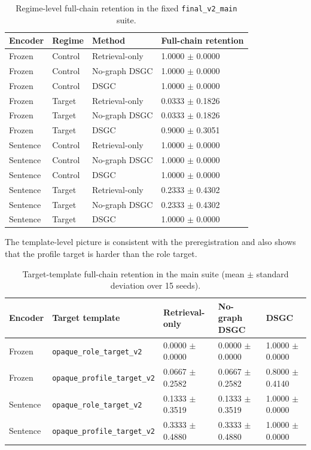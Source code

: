\documentclass[10pt]{article}
\begin{document}
\begin{table}[H]
\centering
\small
\begin{tabular}{llll}
\toprule
Encoder & Regime & Method & Full-chain retention \\
\midrule
Frozen & Control & Retrieval-only & 1.0000 $\pm$ 0.0000 \\
Frozen & Control & No-graph DSGC & 1.0000 $\pm$ 0.0000 \\
Frozen & Control & DSGC & 1.0000 $\pm$ 0.0000 \\
Frozen & Target & Retrieval-only & 0.0333 $\pm$ 0.1826 \\
Frozen & Target & No-graph DSGC & 0.0333 $\pm$ 0.1826 \\
Frozen & Target & DSGC & 0.9000 $\pm$ 0.3051 \\
Sentence & Control & Retrieval-only & 1.0000 $\pm$ 0.0000 \\
Sentence & Control & No-graph DSGC & 1.0000 $\pm$ 0.0000 \\
Sentence & Control & DSGC & 1.0000 $\pm$ 0.0000 \\
Sentence & Target & Retrieval-only & 0.2333 $\pm$ 0.4302 \\
Sentence & Target & No-graph DSGC & 0.2333 $\pm$ 0.4302 \\
Sentence & Target & DSGC & 1.0000 $\pm$ 0.0000 \\
\bottomrule
\end{tabular}
\caption{Regime-level full-chain retention in the fixed \texttt{final\_v2\_main} suite.}
\label{tab:main-regime}
\end{table}

The template-level picture is consistent with the preregistration and also shows that the profile target is harder than the role target.

\begin{table}[H]
\centering
\small
\begin{tabular}{lllll}
\toprule
Encoder & Target template & Retrieval-only & No-graph DSGC & DSGC \\
\midrule
Frozen & \texttt{opaque\_role\_target\_v2} & 0.0000 $\pm$ 0.0000 & 0.0000 $\pm$ 0.0000 & 1.0000 $\pm$ 0.0000 \\
Frozen & \texttt{opaque\_profile\_target\_v2} & 0.0667 $\pm$ 0.2582 & 0.0667 $\pm$ 0.2582 & 0.8000 $\pm$ 0.4140 \\
Sentence & \texttt{opaque\_role\_target\_v2} & 0.1333 $\pm$ 0.3519 & 0.1333 $\pm$ 0.3519 & 1.0000 $\pm$ 0.0000 \\
Sentence & \texttt{opaque\_profile\_target\_v2} & 0.3333 $\pm$ 0.4880 & 0.3333 $\pm$ 0.4880 & 1.0000 $\pm$ 0.0000 \\
\bottomrule
\end{tabular}
\caption{Target-template full-chain retention in the main suite (mean $\pm$ standard deviation over 15 seeds).}
\label{tab:target-templates}
\end{table}
\end{document}
